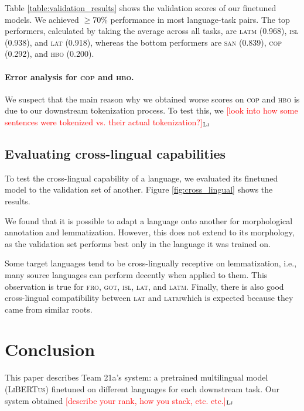 \documentclass[11pt]{article}
\newcommand{\draftonly}[1]{#1}
\newcommand{\draftcomment}[3]{\draftonly{\textcolor{#2}{[#3]{$_{\textsc{#1}}$}}}}
\newcommand{\lj}[1]{\draftcomment{Lj}{red}{#1}}
\newcommand{\libertus}{\textsc{LiBERTus}}
\begin{document}


Table \ref{table:validation_results} shows the validation scores of our finetuned models.
We achieved $\geq$70\% performance in most language-task pairs. 
The top performers, calculated by taking the average across all tasks, are \textsc{latm} (0.968), \textsc{isl} (0.938), and \textsc{lat} (0.918),
whereas the bottom performers are \textsc{san} (0.839), \textsc{cop} (0.292), and \textsc{hbo} (0.200).

\paragraph{Error analysis for \textsc{cop} and \textsc{hbo}.}
We suspect that the main reason why we obtained worse scores on \textsc{cop} and \textsc{hbo} is due to our downstream tokenization process.
To test this, we \lj{look into how some sentences were tokenized vs. their actual tokenization?}

\subsection{Evaluating cross-lingual capabilities}
\label{sec:results_crosslingual}

To test the cross-lingual capability of a language, we evaluated its finetuned model to the validation set of another.
Figure \ref{fig:cross_lingual} shows the results.

We found that it is possible to adapt a language onto another for morphological annotation and lemmatization.
However, this does not extend to its morphology, as the validation set performs best only in the language it was trained on.

Some target languages tend to be cross-lingually receptive on lemmatization, i.e., many source languages can perform decently when applied to them.
This observation is true for \textsc{fro}, \textsc{got}, \textsc{isl}, \textsc{lat}, and \textsc{latm}.
Finally, there is also good cross-lingual compatibility between \textsc{lat} and \textsc{latm}\textemdash which is expected because they came from similar roots. 

\section{Conclusion}

This paper describes Team 21a's system: a pretrained multilingual model (\libertus{}) finetuned on different languages for each downstream task.
Our system obtained \lj{describe your rank, how you stack, etc. etc.}
\end{document}
